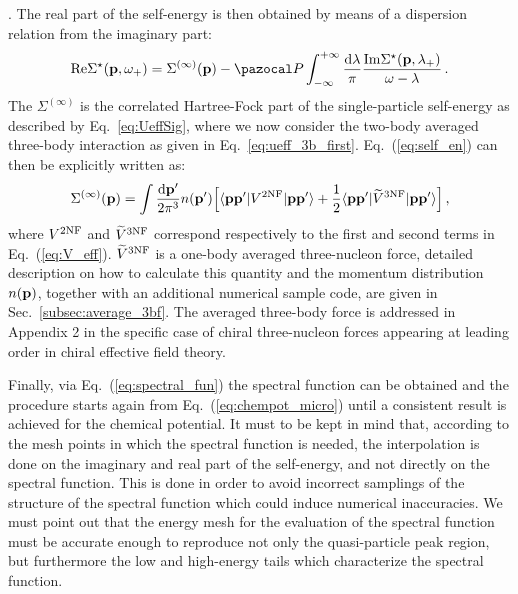 . The real part of the self-energy is then obtained by means of a dispersion relation from the imaginary part: 
\begin{equation}
{\rm Re}\Sigma^\star({\bf p},\omega_+)=\Sigma^{(\infty)}({\bf p})-{\pazocal P}\int_{-\infty}^{+\infty}\frac{{\rm d}{\lambda}}{\pi}\frac{{\rm Im}\Sigma^\star({\bf p},\lambda_+)}{\omega-\lambda}\,.
\label{eq:self_en}
\end{equation}
The $\Sigma^{(\infty)}$ is the correlated Hartree-Fock part of the single-particle self-energy as described by Eq.~\eqref{eq:UeffSig}, where we now consider the two-body averaged three-body interaction as given in Eq.~\eqref{eq:ueff_3b_first}. Eq.~(\ref{eq:self_en}) can then be explicitly written as:
\begin{equation}
\label{eq:HF_self}
\Sigma^{(\infty)}({\bf p})=\int\frac{{\rm d}{\bf p'}}{2\pi^3}n({\bf p'})\Big[\langle{\bf pp'}|V^{\rm 2NF}|{\bf pp'}\rangle +\frac{1}{2}\langle{\bf pp'}|\widetilde V^{\rm 3NF}|{\bf pp'}\rangle\Big] \,,
\end{equation}
where $V^{\rm 2NF}$ and $\widetilde V^{\rm 3NF}$ correspond respectively to the first and second terms in Eq.~(\ref{eq:V_eff}). $\widetilde V^{\rm 3NF}$ is a one-body averaged three-nucleon force, detailed description on how to calculate this quantity and the momentum distribution $n({\bf p})$, together with an additional numerical sample code, are given in Sec.~\ref{subsec:average_3bf}. The averaged three-body force is addressed in Appendix 2 in the specific case of chiral three-nucleon forces appearing at leading order in chiral effective field theory.

Finally, via Eq.~(\ref{eq:spectral_fun}) the spectral function can be obtained and the procedure starts again from Eq.~(\ref{eq:chempot_micro}) until a consistent result is achieved for the chemical potential. It must to be kept in mind that, according to the mesh points in which the spectral function is needed, the interpolation is done on the imaginary and real part of the self-energy, and not directly on the spectral function. This is done in order to avoid incorrect samplings of the structure of the spectral function which could induce numerical inaccuracies. We must point out that the energy mesh for the evaluation of the spectral function must be accurate enough to reproduce not only the quasi-particle peak region, but furthermore the low and high-energy tails which characterize the spectral function.   

